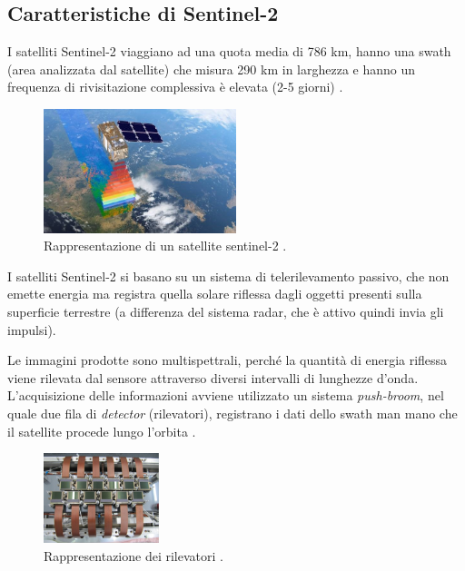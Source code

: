 \subsection{Caratteristiche di Sentinel-2}
I satelliti Sentinel-2 viaggiano ad una quota media di 786 km, hanno una swath (area 
analizzata dal satellite) che misura 290 km in larghezza e hanno un frequenza di 
rivisitazione complessiva è elevata (2-5 giorni) \cite{SENTINEL2_2,SENTINEL2_3, ALL_ABOUT_SENTINEL2}.

\begin{figure}[H]
    \centering
    \includegraphics[width=0.5\textwidth]{Immagini/Satelliti/funzionamento_satellite.png}
    \caption{Rappresentazione di un satellite sentinel-2 \cite{immagini_multispettrali2}. }
\end{figure}

I satelliti Sentinel-2 si basano su un sistema di telerilevamento 
passivo, che non emette energia ma registra quella solare riflessa dagli 
oggetti presenti sulla superficie terrestre (a differenza del sistema radar, 
che è attivo quindi invia gli impulsi).

Le immagini prodotte sono multispettrali, perché la quantità di energia riflessa 
viene rilevata dal sensore attraverso diversi intervalli di lunghezze d’onda.
L'acquisizione delle informazioni avviene utilizzato un sistema 
\textit{push-broom}, nel quale due
fila di \textit{detector} (rilevatori), registrano i dati dello swath man mano che il 
satellite procede lungo l’orbita  \cite{ALL_ABOUT_SENTINEL2}. 

\begin{figure}[H]
    \centering
    \includegraphics[width=0.3\textwidth]{Immagini/Satelliti/rilevatori_S2.png}
    \caption{Rappresentazione dei rilevatori \cite{ALL_ABOUT_SENTINEL2}.}
\end{figure}

